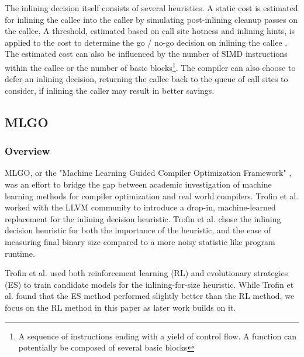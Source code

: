 \documentclass[nohyperref]{article}
\theoremstyle{plain}
\theoremstyle{definition}
\theoremstyle{remark}
\begin{document}
The inlining decision itself consists of several heuristics. A static cost is estimated for inlining the callee into the caller by simulating post-inlining cleanup passes on the callee. A threshold, estimated based on call site hotness and inlining hints, is applied to the cost to determine the go / no-go decision on inlining the callee \cite{mlgo}. The estimated cost can also be influenced by the number of SIMD instructions within the callee or the number of basic blocks\footnote{A sequence of instructions ending with a yield of control flow. A function can potentially be composed of several basic blocks}. The compiler can also choose to defer an inlining decision, returning the callee back to the queue of call sites to consider, if inlining the caller may result in better savings.



\subsection{MLGO}
\subsubsection{Overview}
MLGO, or the "Machine Learning Guided Compiler Optimization Framework" \cite{mlgo}, was an effort to bridge the gap between academic investigation of machine learning methods for compiler optimization and real world compilers. Trofin et al. worked with the LLVM community to introduce a drop-in, machine-learned replacement for the inlining decision heuristic. Trofin et al. chose the inlining decision heuristic for both the importance of the heuristic, and the ease of measuring final binary size compared to a more noisy statistic like program runtime.

Trofin et al. used both reinforcement learning (RL) and evolutionary strategies (ES) to train candidate models for the inlining-for-size heuristic. While Trofin et al. found that the ES method performed slightly better than the RL method, we focus on the RL method in this paper as later work builds on it.
\end{document}
